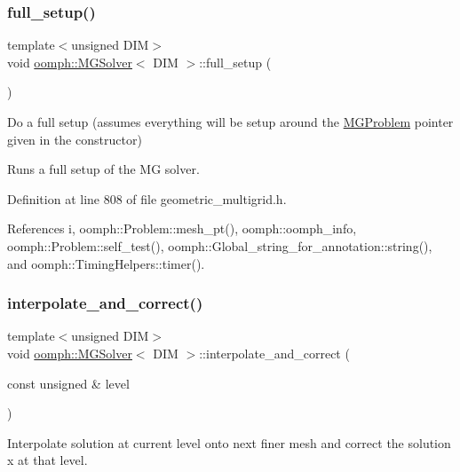 \subsubsection{\texorpdfstring{full\+\_\+setup()}{full\_setup()}}
{\footnotesize\ttfamily template$<$unsigned D\+IM$>$ \\
void \hyperlink{classoomph_1_1MGSolver}{oomph\+::\+M\+G\+Solver}$<$ D\+IM $>$\+::full\+\_\+setup (\begin{DoxyParamCaption}{ }\end{DoxyParamCaption})}



Do a full setup (assumes everything will be setup around the \hyperlink{classoomph_1_1MGProblem}{M\+G\+Problem} pointer given in the constructor) 

Runs a full setup of the MG solver. 

Definition at line 808 of file geometric\+\_\+multigrid.\+h.



References i, oomph\+::\+Problem\+::mesh\+\_\+pt(), oomph\+::oomph\+\_\+info, oomph\+::\+Problem\+::self\+\_\+test(), oomph\+::\+Global\+\_\+string\+\_\+for\+\_\+annotation\+::string(), and oomph\+::\+Timing\+Helpers\+::timer().

\mbox{\label{classoomph_1_1MGSolver_addc29a0b865681c3eaf7d67e702ee995}} 
\subsubsection{\texorpdfstring{interpolate\+\_\+and\+\_\+correct()}{interpolate\_and\_correct()}}
{\footnotesize\ttfamily template$<$unsigned D\+IM$>$ \\
void \hyperlink{classoomph_1_1MGSolver}{oomph\+::\+M\+G\+Solver}$<$ D\+IM $>$\+::interpolate\+\_\+and\+\_\+correct (\begin{DoxyParamCaption}\item[{const unsigned \&}]{level }\end{DoxyParamCaption})}



Interpolate solution at current level onto next finer mesh and correct the solution x at that level. 



